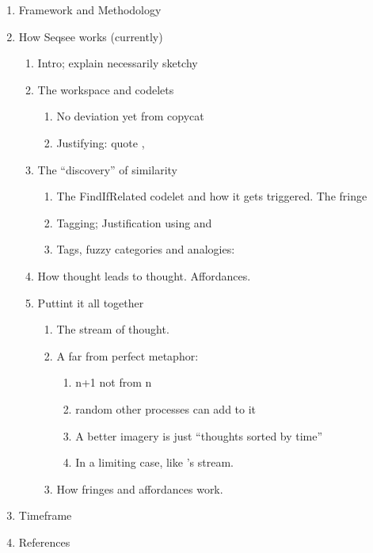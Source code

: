 \documentclass{article}
\begin{document}
\begin{enumerate}
\item Framework and Methodology
\item How Seqsee works (currently)
  \begin{enumerate}
  \item Intro; explain necessarily sketchy
  \item The workspace and codelets
    \begin{enumerate}
    \item No deviation yet from copycat
    \item Justifying: quote \cite{Hofstadter:FCCA}, \cite{Hearsay}
    \end{enumerate}
  \item The ``discovery'' of similarity
    \begin{enumerate}
    \item The FindIfRelated codelet and how it gets triggered. The fringe \cite{James}
    \item Tagging; Justification using \cite{Clark:MagicWords} and \cite{Dennett:Labeling}
      \item Tags, fuzzy categories and analogies: \cite{Hofstadter:LeTon}
    \end{enumerate}
    \item How thought leads to thought. Affordances.
    \item Puttint it all together
      \begin{enumerate}
      \item The stream of thought.
      \item A far from perfect metaphor:
        \begin{enumerate}
        \item n+1 not from n
        \item random other processes can add to it
        \item A better imagery is just ``thoughts sorted by time''
        \item In a limiting case, like \cite{Dennett:Consciousness}'s stream.
        \end{enumerate}
      \item How fringes and affordances work.
      \end{enumerate}
  \end{enumerate}
  
\item Timeframe
\item References

\end{enumerate}



\end{document}
